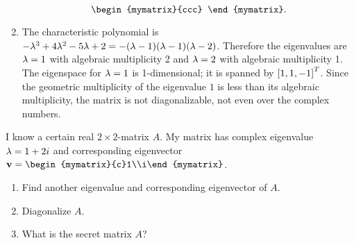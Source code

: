 \begin{enumialphparenastyle}
\begin{ex}
\begin{sol}
\begin{enumerate}
\begin{equation*}
\begin{mymatrix}{ccc}
        \end{mymatrix}.
      \end{equation*}
    \item The characteristic polynomial is
      $-\lambda^3 +4\lambda^2 -5\lambda + 2 =
      -(\lambda-1)(\lambda-1)(\lambda-2)$. Therefore the
      eigenvalues are $\lambda=1$ with algebraic multiplicity 2 and
      $\lambda=2$ with algebraic multiplicity 1. The eigenspace for
      $\lambda=1$ is 1-dimensional; it is spanned by
      $\left[1,1,-1\right]^T$. Since the geometric multiplicity of the
      eigenvalue $1$ is less than its algebraic multiplicity, the
      matrix is not diagonalizable, not even over the complex numbers.
    \end{enumerate}
  \end{sol}
\end{ex}

\begin{ex}
  I know a certain real $2\times 2$-matrix $A$. My matrix has complex
  eigenvalue $\lambda=1+2i$ and corresponding eigenvector
  $\vect{v}=\begin{mymatrix}{c}1\\i\end{mymatrix}$.
  \begin{enumerate}
  \item Find another eigenvalue and corresponding eigenvector of $A$.
  \item Diagonalize $A$.
  \item What is the secret matrix $A$?
  \end{enumerate}


\end{ex}
\end{enumialphparenastyle}
